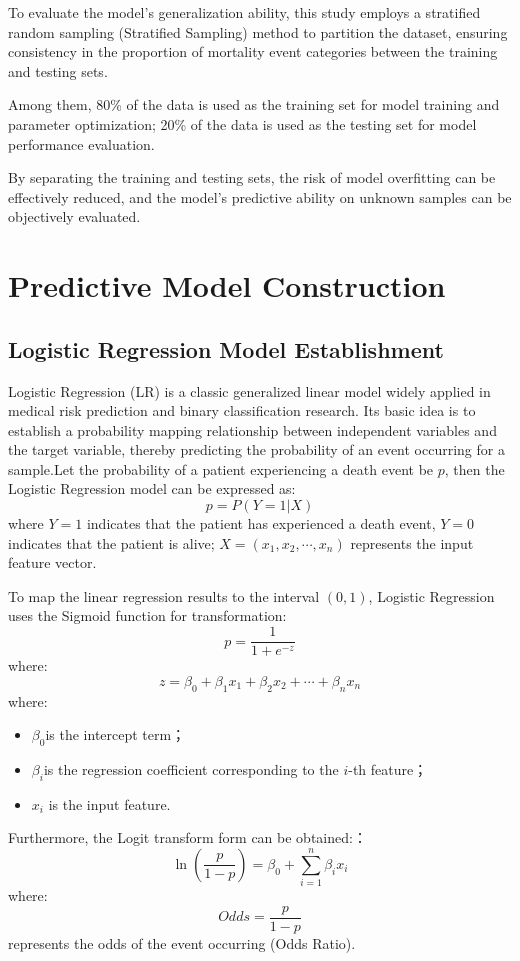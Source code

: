 \documentclass[11pt,a4paper]{article}
\begin{document}
To evaluate the model's generalization ability, this study employs a stratified random sampling (Stratified Sampling) method to partition the dataset, ensuring consistency in the proportion of mortality event categories between the training and testing sets.

Among them, 80\% of the data is used as the training set for model training and parameter optimization; 20\% of the data is used as the testing set for model performance evaluation.

By separating the training and testing sets, the risk of model overfitting can be effectively reduced, and the model's predictive ability on unknown samples can be objectively evaluated.

\section{Predictive Model Construction}

\subsection{Logistic Regression Model Establishment}

Logistic Regression (LR) is a classic generalized linear model widely applied in medical risk prediction and binary classification research. Its basic idea is to establish a probability mapping relationship between independent variables and the target variable, thereby predicting the probability of an event occurring for a sample.Let the probability of a patient experiencing a death event be $p$, then the Logistic Regression model can be expressed as:
\begin{equation}
p=P(Y=1|X)
\end{equation}
where $Y=1$ indicates that the patient has experienced a death event, $Y=0$ indicates that the patient is alive; $X=(x_1,x_2,\cdots,x_n)$ represents the input feature vector.

To map the linear regression results to the interval $(0,1)$, Logistic Regression uses the Sigmoid function for transformation:
\begin{equation}
p=\frac{1}{1+e^{-z}}
\end{equation}
where:
\begin{equation}
z=\beta_0+\beta_1x_1+\beta_2x_2+\cdots+\beta_nx_n
\end{equation}
where:
\begin{itemize}
\item $\beta_0$is the intercept term；
\item $\beta_i$is the regression coefficient corresponding to the $i$-th feature；
\item $x_i$ is the input feature.
\end{itemize}
Furthermore, the Logit transform form can be obtained:：
\begin{equation}
\ln\left(\frac{p}{1-p}\right)
=
\beta_0+\sum_{i=1}^{n}\beta_i x_i
\end{equation}
where:
\begin{equation}
Odds=\frac{p}{1-p}
\end{equation}
represents the odds of the event occurring (Odds Ratio).
\end{document}
